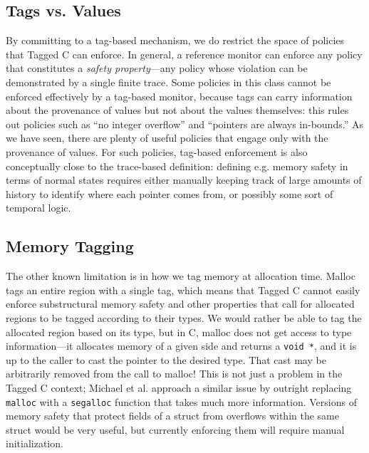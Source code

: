 \documentclass{llncs}
\begin{document}
\subsection{Tags vs. Values}

By committing to a tag-based mechanism, we do restrict the space of policies that Tagged C
can enforce. In general, a reference monitor can enforce any policy that constitutes a
{\em safety property}---any policy whose violation can be demonstrated by a single finite
trace. Some policies in this class cannot be enforced effectively by a tag-based monitor,
because tags can carry information about the provenance of values but not about the values
themselves: this rules out policies such as ``no integer overflow'' and
``pointers are always in-bounds.'' As we have seen, there are plenty of useful policies that
engage only with the provenance of values. For such policies, tag-based enforcement is
also conceptually close to the trace-based definition: defining e.g. memory safety in terms
of normal states requires either manually keeping track of large amounts of history to
identify where each pointer comes from, or possibly some sort of temporal logic.

\subsection{Memory Tagging}

The other known limitation is in how we tag memory at allocation time. Malloc tags an
entire region with a single tag, which means that Tagged C cannot easily
enforce substructural memory safety and other properties that call for allocated
regions to be tagged according to their types. We would rather be able to tag the allocated region
based on its type, but in C, malloc does not get access to type information---it allocates
memory of a given side and returns a {\tt void *}, and it is up to the caller to cast the
pointer to the desired type. That cast may be arbitrarily removed from the call to malloc!
This is not just a problem in the Tagged C context; Michael et al.
\cite{Michael23:MSWASM} approach a similar issue by outright replacing {\tt malloc}
with a {\tt segalloc} function that takes much more information.
Versions of memory safety that protect fields of a
struct from overflows within the same struct would be very useful, but currently enforcing
them will require manual initialization.
\end{document}

